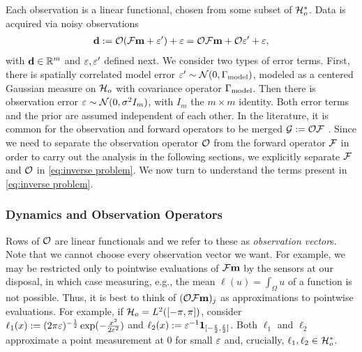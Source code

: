 
Each observation is a linear functional, chosen from some subset of
$\mathcal{H}_o^{*}$. Data is acquired via noisy observations
\begin{align}\label{eq:inverse problem}
  \data := \obs (\fwd \param + \eps') + \eps = \obs \fwd \param + \obs \eps' + \eps,
\end{align}
with $\mathbf{d} \in \mathbb{R}^m$ and $\varepsilon, \varepsilon'$ defined next. We consider two
types of error terms. First, there is spatially correlated model error
$\varepsilon' \sim \mathcal{N}(0,\Gamma_{\textup{model}})$, modeled as a centered Gaussian
measure on $\mathcal{H}_o$ with covariance operator $\Gamma_{\textup{model}}$. Then there is
observation error $\varepsilon \sim \mathcal{N}(0, \sigma^2 I_m)$, with $I_m$ the
$m \times m$ identity. Both error terms and the prior are assumed
independent of each other. In the literature, it is common for the
observation and forward operators to be merged $\mathcal{G} := \mathcal{O} \mathcal{F}$
\cite{AlexanderianGloorGhattas14}. Since we need to separate the
observation operator $\mathcal{O}$ from the forward operator $\mathcal{F}$ in order
to carry out the analysis in the following sections, we explicitly
separate $\mathcal{F}$ and $\mathcal{O}$ in \eqref{eq:inverse problem}. We now turn
to understand the terms present in \eqref{eq:inverse problem}.


\subsubsection{Dynamics and Observation Operators}\label{subsec:dynamics}
Rows of $\mathcal{O}$ are linear functionals and we refer to these as {\it
  observation vector}s. Note that we cannot choose every observation
vector we want. For example, we may be restricted only to pointwise
evaluations of $\mathcal{F} \mathbf{m}$ by the sensors at our disposal, in which
case measuring, e.g., the mean $\ell(u) = \int_{\Omega}u$ of a
function is not possible. Thus, it is best to think of $(\mathcal{O} \mathcal{F}
\mathbf{m})_j$ as approximations to pointwise evaluations. For example, if
$\mathcal{H}_o = L^2([-\pi, \pi])$, consider $\ell_1(x) := (2\pi
\varepsilon)^{-\frac{1}{2}}\exp(-\frac{x^2}{2\varepsilon^2})$ and $\ell_2(x)
:=\varepsilon^{-1}\mathbf{1}_{[-\frac{\varepsilon}{2}, \frac{\varepsilon}{2}]}$. Both
$\ell_1$ and $\ell_2$ approximate a point measurement at $0$ for small
$\varepsilon$ and, crucially, $\ell_1, \ell_2 \in \mathcal{H}_o^*$.


